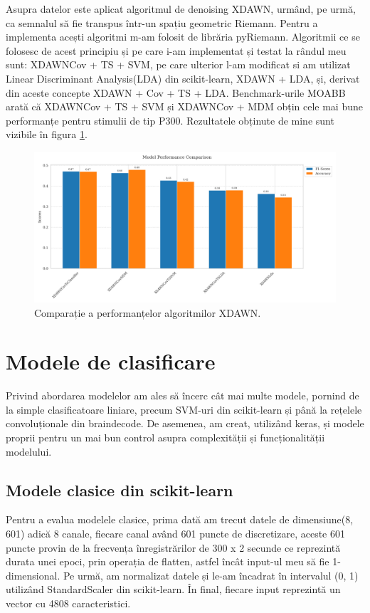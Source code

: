 Asupra datelor este aplicat algoritmul de denoising XDAWN\cite{xdawn}, urmând, pe urmă, ca semnalul să fie transpus într-un spațiu geometric Riemann. Pentru a implementa acești algoritmi m-am folosit de librăria pyRiemann\cite{pyriemann}. Algoritmii ce se folosesc de acest principiu și pe care i-am implementat și testat la rândul meu sunt: XDAWNCov + TS + SVM\cite{xdawncovtssvm}, pe care ulterior l-am modificat si am utilizat Linear Discriminant Analysis(LDA) din scikit-learn\cite{scikit-learn}, XDAWN + LDA\cite{xdawnlda}, și, derivat din aceste concepte XDAWN + Cov + TS + LDA. Benchmark-urile MOABB\cite{moabb}  arată că XDAWNCov + TS + SVM și XDAWNCov + MDM obțin cele mai bune performanțe pentru stimulii de tip P300. Rezultatele obținute de mine sunt vizibile în figura \ref{fig:rezultate_xdawn}.

\vspace{1em}
\begin{figure}[H]
    \centering
		\vspace{-1em}
    \includegraphics[width=1\linewidth]{comparison_xdawn.png}
    \caption{Comparație a performanțelor algoritmilor XDAWN.}
		\vspace{-1em}
    \label{fig:rezultate_xdawn}
\end{figure}

\section{Modele de clasificare}
Privind abordarea modelelor am ales să încerc cât mai multe modele, pornind de la simple clasificatoare liniare, precum SVM-uri din scikit-learn\cite{scikit-learn} și până la rețelele convoluționale din braindecode\cite{braindecode}. De asemenea, am creat, utilizând keras\cite{keras}, și modele proprii pentru un mai bun control asupra complexității și funcționalității modelului.
\subsection{Modele clasice din scikit-learn}
Pentru a evalua modelele clasice, prima dată am trecut datele de dimensiune(8, 601) adică 8 canale, fiecare canal având 601 puncte de discretizare, aceste 601 puncte provin de la frecvența înregistrărilor de 300 x 2 secunde ce reprezintă durata unei epoci, prin operația de flatten, astfel încât input-ul meu să fie 1-dimensional. Pe urmă, am normalizat datele și le-am încadrat în intervalul (0, 1) utilizând StandardScaler din scikit-learn\cite{scikit-learn}. În final, fiecare input reprezintă un vector cu 4808 caracteristici.

